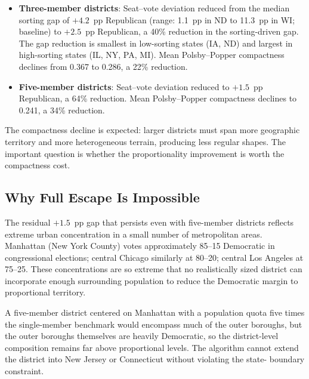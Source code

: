 \begin{itemize}
  \item \textbf{Three-member districts}: Seat--vote deviation reduced from
        the median sorting gap of $+4.2$~pp Republican (range: 1.1~pp in ND
        to 11.3~pp in WI; baseline) to $+2.5$~pp Republican, a 40\%
        reduction in the sorting-driven gap.  The gap reduction is smallest
        in low-sorting states (IA, ND) and largest in high-sorting states
        (IL, NY, PA, MI).  Mean Polsby--Popper compactness declines from
        0.367 to 0.286, a 22\% reduction.

  \item \textbf{Five-member districts}: Seat--vote deviation reduced to
        $+1.5$~pp Republican, a 64\% reduction.  Mean Polsby--Popper
        compactness declines to 0.241, a 34\% reduction.
\end{itemize}

The compactness decline is expected: larger districts must span more
geographic territory and more heterogeneous terrain, producing less regular
shapes.  The important question is whether the proportionality improvement
is worth the compactness cost.

\subsection{Why Full Escape Is Impossible}

The residual $+1.5$~pp gap that persists even with five-member districts
reflects extreme urban concentration in a small number of metropolitan areas.
Manhattan (New York County) votes approximately 85--15 Democratic in
congressional elections; central Chicago similarly at 80--20; central Los
Angeles at 75--25.  These concentrations are so extreme that no realistically
sized district can incorporate enough surrounding population to reduce the
Democratic margin to proportional territory.

A five-member district centered on Manhattan with a population quota five times
the single-member benchmark would encompass much of the outer boroughs, but
the outer boroughs themselves are heavily Democratic, so the district-level
composition remains far above proportional levels.  The algorithm cannot
extend the district into New Jersey or Connecticut without violating the state-
boundary constraint.


